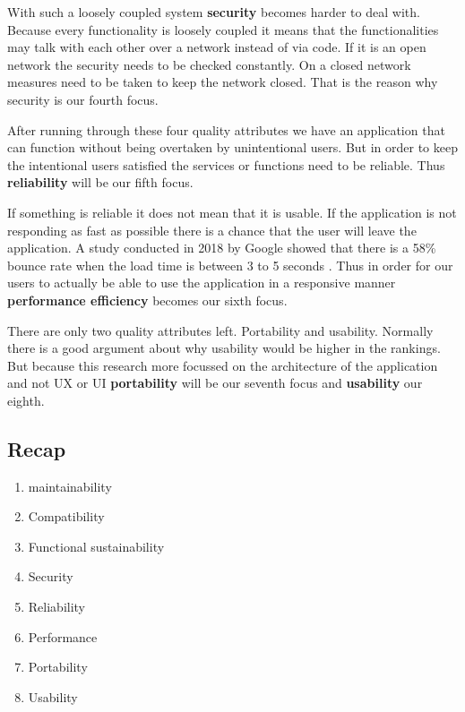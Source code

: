 With such a loosely coupled system \textbf{security} becomes harder to deal with. Because every functionality is loosely coupled it means that the functionalities may talk with each other over a network instead of via code. If it is an open network the security needs to be checked constantly. On a closed network measures need to be taken to keep the network closed. That is the reason why security is our fourth focus.

After running through these four quality attributes we have an application that can function without being overtaken by unintentional users. But in order to keep the intentional users satisfied the services or functions need to be reliable. Thus \textbf{reliability} will be our fifth focus.

If something is reliable it does not mean that it is usable. If the application is not responding as fast as possible there is a chance that the user will leave the application. A study conducted in 2018 by Google showed that there is a 58\% bounce rate when the load time is between 3 to 5 seconds \cite{bounceRateDifference}. Thus in order for our users to actually be able to use the application in a responsive manner \textbf{performance efficiency} becomes our sixth focus.

There are only two quality attributes left. Portability and usability. Normally there is a good argument about why usability would be higher in the rankings. But because this research more focussed on the architecture of the application and not UX or UI \textbf{portability} will be our seventh focus and \textbf{usability} our eighth.

\subsection{Recap}
\label{sec:IsoRecap}

\begin{enumerate}
        \item maintainability
        \item Compatibility
        \item Functional sustainability
        \item Security
        \item Reliability
        \item Performance
        \item Portability
        \item Usability
\end{enumerate}

